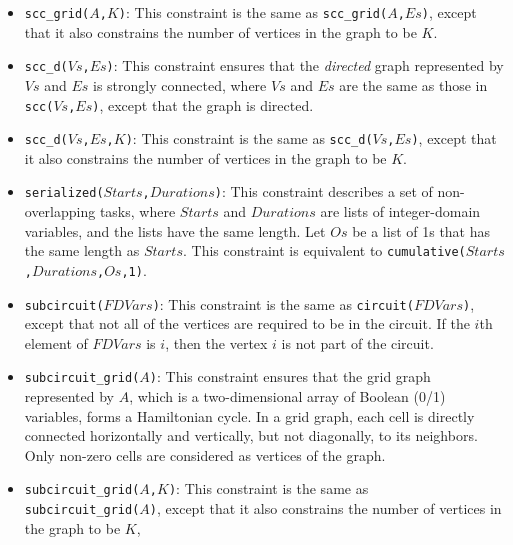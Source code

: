\begin{itemize}
\item \texttt{scc\_grid($A$,$K$)}: This constraint is the same as \texttt{scc\_grid($A$,$Es$)}, except that it also constrains the number of vertices in the graph to be $K$. 

\item \texttt{scc\_d($Vs$,$Es$)}: This constraint ensures that the \textit{directed} graph represented by $Vs$ and $Es$ is strongly connected, where $Vs$ and $Es$ are the same as those in \texttt{scc($Vs$,$Es$)}, except that the graph is directed.

\item \texttt{scc\_d($Vs$,$Es$,$K$)}: This constraint is the same as \texttt{scc\_d($Vs$,$Es$)}, except that it also constrains the number of vertices in the graph to be $K$. 

\item \texttt{serialized($Starts$,$Durations$)}: This constraint describes a set of non-overlapping tasks, where $Starts$ and $Durations$ are lists of integer-domain variables, and the lists have the same length. Let $Os$ be a list of 1s that has the same length as $Starts$. This constraint is equivalent to \texttt{cumulative($Starts$,$Durations$,$Os$,1)}.

\item \texttt{subcircuit($FDVars$)}: This constraint is the same as \texttt{circuit($FDVars$)}, except that not all of the vertices are required to be in the circuit. If the $i$th element of $FDVars$ is $i$, then the vertex $i$ is not part of the circuit. 

\item \texttt{subcircuit\_grid($A$)}: This constraint ensures that the grid graph represented by $A$, which is a two-dimensional array of Boolean (0/1) variables, forms a Hamiltonian cycle. In a grid graph, each cell is directly connected horizontally and vertically, but not diagonally, to its neighbors. Only non-zero cells are considered as vertices of the graph.

\item \texttt{subcircuit\_grid($A$,$K$)}: This constraint is the same as \\\texttt{subcircuit\_grid($A$)}, except that it also constrains the number of vertices in the graph to be $K$, 


\end{itemize}
